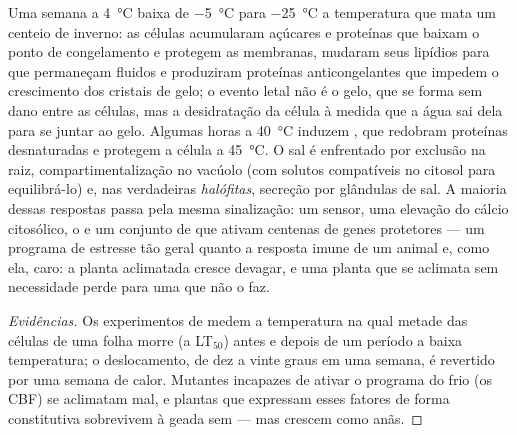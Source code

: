 \begin{proposition}\label{prop:b2:plant-plasticity:stress}
Uma semana a \qty{4}{\celsius} baixa de \qty{-5}{\celsius} para
\qty{-25}{\celsius} a temperatura que mata um centeio de inverno: as
células acumularam açúcares e proteínas que baixam o ponto de
congelamento e protegem as membranas, mudaram seus lipídios para que
permaneçam fluidos e produziram proteínas anticongelantes que impedem
o crescimento dos cristais de gelo; o evento letal não é o gelo, que
se forma sem dano entre as células, mas a desidratação da célula à
medida que a água sai dela para se juntar ao gelo. Algumas horas a
\qty{40}{\celsius} induzem \emph{}, que
redobram proteínas desnaturadas e protegem a célula a
\qty{45}{\celsius}. O sal é enfrentado por exclusão na raiz,
compartimentalização no vacúolo (com solutos compatíveis no citosol
para equilibrá-lo) e, nas verdadeiras \emph{halófitas}, secreção por
glândulas de sal. A maioria dessas respostas passa pela mesma
sinalização: um sensor, uma elevação do cálcio citosólico, o  e um conjunto de  que ativam centenas
de genes protetores --- um programa de estresse tão geral quanto a
resposta imune de um animal e, como ela, caro: a planta aclimatada
cresce devagar, e uma planta que se aclimata sem necessidade perde para
uma que não o faz.
\end{proposition}
\begin{proof}[Evidências]
Os experimentos de  medem a temperatura na qual
metade das células de uma folha morre (a LT$_{50}$) antes e depois de
um período a baixa temperatura; o deslocamento, de dez a vinte graus em
uma semana, é revertido por uma semana de calor. Mutantes incapazes de
ativar o programa do frio (os  CBF) se aclimatam
mal, e plantas que expressam esses fatores de forma constitutiva
sobrevivem à geada sem  --- mas crescem como anãs.
\end{proof}

